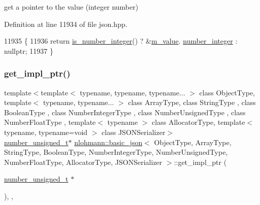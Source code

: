 get a pointer to the value (integer number) 



Definition at line 11934 of file json.\+hpp.


\begin{DoxyCode}
11935     \{
11936         \textcolor{keywordflow}{return} \hyperlink{classnlohmann_1_1basic__json_abac8af76067f1e8fdca9052882c74428}{is\_number\_integer}() ? &\hyperlink{classnlohmann_1_1basic__json_aeb0814f76966f99290cb29e127c90a77}{m\_value}.
      \hyperlink{unionnlohmann_1_1basic__json_1_1json__value_afa3c414445aeffb56a7c6926f9420941}{number\_integer} : \textcolor{keyword}{nullptr};
11937     \}
\end{DoxyCode}
\mbox{\label{classnlohmann_1_1basic__json_aa9aaed6b92909b263e04b5d25eba8d67}} 
\subsubsection{\texorpdfstring{get\+\_\+impl\+\_\+ptr()}{get\_impl\_ptr()}\hspace{0.1cm}{\footnotesize\ttfamily [11/14]}}
{\footnotesize\ttfamily template$<$template$<$ typename, typename, typename... $>$ class Object\+Type, template$<$ typename, typename... $>$ class Array\+Type, class String\+Type , class Boolean\+Type , class Number\+Integer\+Type , class Number\+Unsigned\+Type , class Number\+Float\+Type , template$<$ typename $>$ class Allocator\+Type, template$<$ typename, typename=void $>$ class J\+S\+O\+N\+Serializer$>$ \\
\hyperlink{classnlohmann_1_1basic__json_ab906e29b5d83ac162e823ada2156b989}{number\+\_\+unsigned\+\_\+t}$\ast$ \hyperlink{classnlohmann_1_1basic__json}{nlohmann\+::basic\+\_\+json}$<$ Object\+Type, Array\+Type, String\+Type, Boolean\+Type, Number\+Integer\+Type, Number\+Unsigned\+Type, Number\+Float\+Type, Allocator\+Type, J\+S\+O\+N\+Serializer $>$\+::get\+\_\+impl\+\_\+ptr (\begin{DoxyParamCaption}\item[{\hyperlink{classnlohmann_1_1basic__json_ab906e29b5d83ac162e823ada2156b989}{number\+\_\+unsigned\+\_\+t} $\ast$}]{ }\end{DoxyParamCaption})\hspace{0.3cm}{\ttfamily [inline]}, {\ttfamily [private]}, {\ttfamily [noexcept]}}




